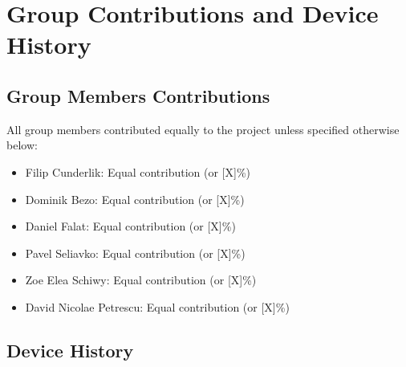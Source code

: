 \chapter*{Group Contributions and Device History}

\section*{Group Members Contributions}
\noindent All group members contributed equally to the project unless specified otherwise below:
\begin{itemize}
    \item Filip Cunderlik: Equal contribution (or [X]\%)
    \item Dominik Bezo: Equal contribution (or [X]\%)
    \item Daniel Falat: Equal contribution (or [X]\%)
    \item Pavel Seliavko: Equal contribution (or [X]\%)
    \item Zoe Elea Schiwy: Equal contribution (or [X]\%)
    \item David Nicolae Petrescu: Equal contribution (or [X]\%)
\end{itemize}

\vspace{1.5cm}

\section*{Device History}

